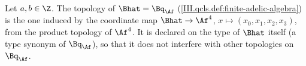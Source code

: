 Let $a,b\in\Z$. The topology of $\Bhat=\Bq_{\Af}$ (\cref{III.qcls.def:finite-adelic-algebra}) is the one induced by the coordinate map
$\Bhat\to\Af^4$, $x\mapsto(x_0,x_1,x_2,x_3)$, from the product topology of $\Af^4$. It is declared on the type of $\Bhat$ itself (a type synonym of
$\Bq_{\Af}$), so that it does not interfere with other topologies on $\Bq_{\Af}$.

